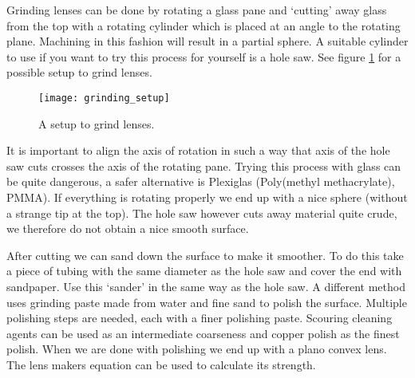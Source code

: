 Grinding lenses can be done by rotating a glass pane and `cutting' away glass from the top with a rotating cylinder which is placed at an angle to the rotating plane. Machining in this fashion will result in a partial sphere. A suitable cylinder to use if you want to try this process for yourself is a hole saw. See figure \ref{fig:grinding_setup} for a possible setup to grind lenses.

\begin{figure}
    \centering
    \texttt{[image: grinding\_setup]}
    \caption{A setup to grind lenses.}\label{fig:grinding_setup}
\end{figure}

It is important to align the axis of rotation in such a way that axis of the hole saw cuts crosses the axis of the rotating pane. Trying this process with glass can be quite dangerous, a safer alternative is Plexiglas (Poly(methyl methacrylate), PMMA). If everything is rotating properly we end up with a nice sphere (without a strange tip at the top). The hole saw however cuts away material quite crude, we therefore do not obtain a nice smooth surface.

After cutting we can sand down the surface to make it smoother. To do this take a piece of tubing with the same diameter as the hole saw  and cover the end with sandpaper. Use this `sander' in the same way as the hole saw. A different method uses grinding paste made from water and fine sand to polish the surface. Multiple polishing steps are needed, each with a finer polishing paste. Scouring cleaning agents can be used as an intermediate coarseness and copper polish as the finest polish. When we are done with polishing we end up with a plano convex lens. The lens makers equation can be used to calculate its strength.


